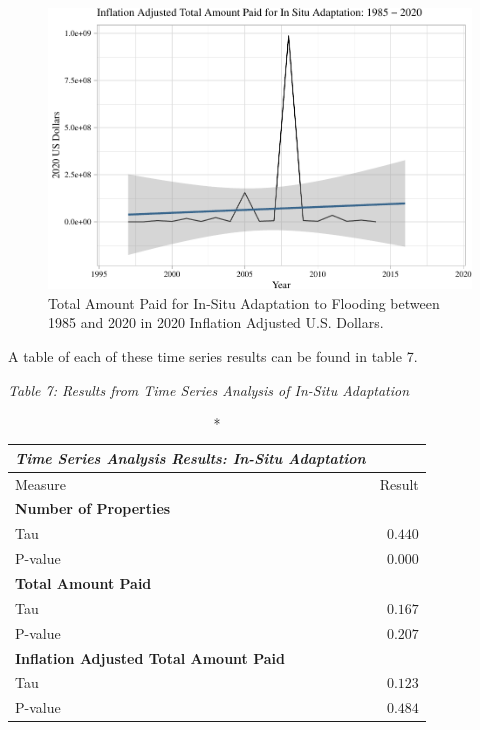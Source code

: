 \documentclass[
  12pt,
]{article}
\begin{document}
\begin{figure}
\centering
\includegraphics{finalreport_files/figure-latex/unnamed-chunk-24-1.pdf}
\caption{Total Amount Paid for In-Situ Adaptation to Flooding between
1985 and 2020 in 2020 Inflation Adjusted U.S. Dollars.}
\end{figure}

\newpage

A table of each of these time series results can be found in table 7.

\emph{Table 7: Results from Time Series Analysis of In-Situ
Adaptation}\\
\captionsetup[table]{labelformat=empty,skip=1pt}

\begin{longtable}{lr}
\caption*{
{\large \emph{\textbf{Time Series Analysis Results: In-Situ Adaptation}}}
} \\ 
\toprule
Measure & Result \\ 
\midrule
\multicolumn{1}{l}{\textbf{Number of Properties}} \\ 
\midrule
Tau & $0.440$ \\ 
P-value & $0.000$ \\ 
\midrule
\multicolumn{1}{l}{\textbf{Total Amount Paid}} \\ 
\midrule
Tau & $0.167$ \\ 
P-value & $0.207$ \\ 
\midrule
\multicolumn{1}{l}{\textbf{Inflation Adjusted Total Amount Paid}} \\ 
\midrule
Tau & $0.123$ \\ 
P-value & $0.484$ \\ 
\bottomrule
\end{longtable}
\end{document}
